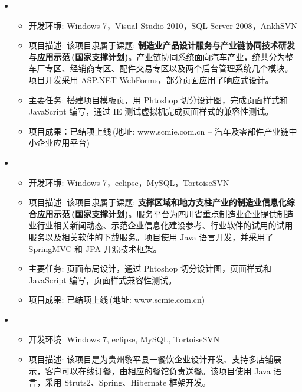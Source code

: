   \begin{itemize}[leftmargin=*]
    \item
      {\small
      \begin{itemize}
        \item 开发环境: Windows 7，Visual Studio 2010，SQL Server 2008，AnkhSVN
        \item 项目描述: 该项目隶属于课题: \textbf{制造业产品设计服务与产业链协同技术研发与应用示范$\,$(国家支撑计划)}。产业链协同系统面向汽车产业，统共分为整车厂专区、经销商专区、配件交易专区以及两个后台管理系统几个模块。项目开发采用 ASP.NET WebForms，部分页面应用了响应式设计。
        \item 主要任务: 搭建项目模板页，用 Phtoshop 切分设计图，完成页面样式和 JavaScript 编写，通过 IE 测试虚拟机完成页面样式的兼容性测试。
        \item 项目成果：已结项上线$\,$(地址: www.scmie.com.cn -- 汽车及零部件产业链中小企业应用平台)
      \end{itemize}
      }
    \item
      {\small
      \begin{itemize}
        \item 开发环境: Windows 7，eclipse，MySQL，TortoiseSVN
        \item 项目描述: 该项目隶属于课题: \textbf{支撑区域和地方支柱产业的制造业信息化综合应用示范$\,$(国家支撑计划)}。服务平台为四川省重点制造业企业提供制造业行业相关新闻动态、示范企业信息化建设参考、行业软件的试用的试用服务以及相关软件的下载服务。项目使用 Java 语言开发，并采用了 SpringMVC 和 JPA 开源技术框架。
        \item 主要任务: 页面布局设计，通过 Phtoshop 切分设计图，页面样式和 JavaScript 编写，页面样式兼容性测试。
        \item 项目成果: 已结项上线$\,$(地址: www.scmie.com.cn)
      \end{itemize}
      }
    \item
    {\small
    \begin{itemize}
      \item 开发环境: Windows 7, eclipse, MySQL, TortoiseSVN
      \item 项目描述: 该项目是为贵州黎平县一餐饮企业设计开发、支持多店铺展示，客户可以在线订餐，由相应的餐馆负责送餐。该项目使用 Java 语言，采用 Struts2、Spring、Hibernate 框架开发。

\end{itemize}}
\end{itemize}
